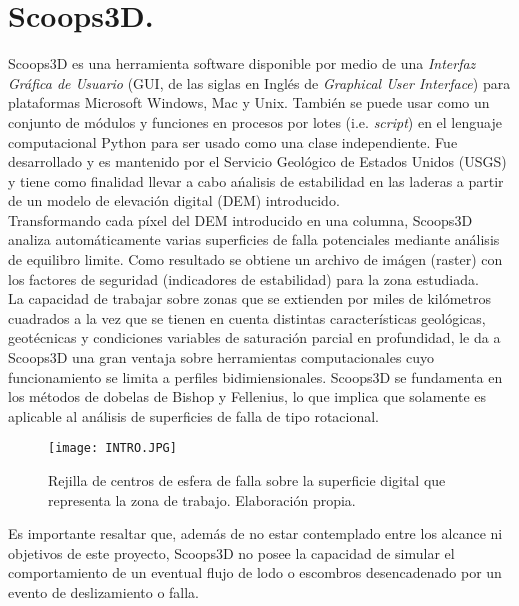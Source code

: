 \chapter{Scoops3D.}
\label{chap_Scoops3d}

Scoops3D es una herramienta software disponible por medio de una \emph{Interfaz Gr\'afica de Usuario} (GUI, de las siglas en Ingl\'es de \textit{Graphical User Interface}) para plataformas Microsoft Windows, Mac y Unix. Tambi\'en se puede usar como un conjunto de m\'odulos y funciones en procesos por lotes (i.e. \textit{script}) en el lenguaje computacional Python para ser usado como una clase independiente. Fue desarrollado y es mantenido por el Servicio Geol\'ogico de Estados Unidos (USGS) y tiene como finalidad llevar a cabo a\'nalisis de estabilidad en las laderas a partir de un modelo de elevaci\'on digital (DEM) introducido.\\

Transformando cada p\'ixel del DEM introducido en una columna, Scoops3D analiza autom\'aticamente varias superficies de falla potenciales mediante an\'alisis de equilibro limite.  Como resultado se obtiene un archivo de im\'agen (raster) con los factores de seguridad (indicadores de estabilidad) para la zona estudiada.\\

La capacidad de trabajar sobre zonas que se extienden por miles de kil\'ometros cuadrados a la vez que se tienen en cuenta distintas caracter\'isticas geol\'ogicas, geot\'ecnicas y condiciones variables de saturaci\'on parcial en profundidad, le da a Scoops3D una gran ventaja sobre herramientas computacionales cuyo funcionamiento se limita a perfiles bidimiensionales.
Scoops3D se fundamenta en los m\'etodos de dobelas de Bishop y Fellenius, lo que implica que solamente es aplicable al an\'alisis de superficies de falla de tipo rotacional.

\begin{figure}[H]
\centering
\texttt{[image: INTRO.JPG]}
\caption{Rejilla de centros de esfera de falla sobre la superficie digital que representa la zona de trabajo. Elaboraci\'on propia.}
\end{figure}
Es importante resaltar que, adem\'as de no estar contemplado entre los alcance ni objetivos de este proyecto, Scoops3D no posee la capacidad de simular el comportamiento de un eventual flujo de lodo o escombros desencadenado por un evento de deslizamiento o falla. 

